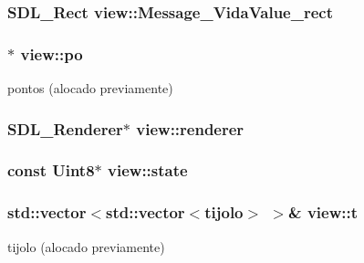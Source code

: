 \subsubsection[{\texorpdfstring{Message\+\_\+\+Vida\+Value\+\_\+rect}{Message_VidaValue_rect}}]{\setlength{\rightskip}{0pt plus 5cm}S\+D\+L\+\_\+\+Rect view\+::\+Message\+\_\+\+Vida\+Value\+\_\+rect\hspace{0.3cm}{\ttfamily [private]}}\hypertarget{classview_a1a7059536cb8e091ff7d4a4f2526bcce}{}\label{classview_a1a7059536cb8e091ff7d4a4f2526bcce}
\subsubsection[{\texorpdfstring{po}{po}}]{$\ast$ view\+::po\hspace{0.3cm}{\ttfamily [private]}}\hypertarget{classview_a8dc345a9799a79220ecca66c4cd3e8ff}{}\label{classview_a8dc345a9799a79220ecca66c4cd3e8ff}
pontos (alocado previamente) 
\subsubsection[{\texorpdfstring{renderer}{renderer}}]{\setlength{\rightskip}{0pt plus 5cm}S\+D\+L\+\_\+\+Renderer$\ast$ view\+::renderer\hspace{0.3cm}{\ttfamily [private]}}\hypertarget{classview_a8d7b3ec0a0641d24cdc3b04949f5df45}{}\label{classview_a8d7b3ec0a0641d24cdc3b04949f5df45}
\subsubsection[{\texorpdfstring{state}{state}}]{\setlength{\rightskip}{0pt plus 5cm}const Uint8$\ast$ view\+::state\hspace{0.3cm}{\ttfamily [private]}}\hypertarget{classview_a6fd7fc350d9ad94dfd47e324b107e8ce}{}\label{classview_a6fd7fc350d9ad94dfd47e324b107e8ce}
\subsubsection[{\texorpdfstring{t}{t}}]{\setlength{\rightskip}{0pt plus 5cm}std\+::vector$<$std\+::vector$<${\bf tijolo}$>$ $>$\& view\+::t\hspace{0.3cm}{\ttfamily [private]}}\hypertarget{classview_adf9164a1a6940c4224d67b5c33424f10}{}\label{classview_adf9164a1a6940c4224d67b5c33424f10}
tijolo (alocado previamente) 
